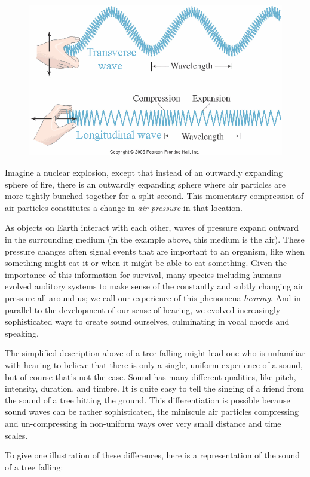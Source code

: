 \documentclass[UTF8]{book}
\begin{document}
\begin{CJK}{UTF8}{gbsn}
\begin{figure}[H]
\centering
\includegraphics[width=0.8\linewidth]{longvstransvwave}
\end{figure}

Imagine a nuclear explosion, except that instead of an outwardly expanding sphere of fire, there is an outwardly expanding sphere where air particles are more tightly bunched together for a split second. This momentary compression of air particles constitutes a change in \emph{air pressure} in that location.

As objects on Earth interact with each other, waves of pressure expand outward in the surrounding medium (in the example above, this medium is the air). These pressure changes often signal events that are important to an organism, like when something might eat it or when it might be able to eat something. Given the importance of this information for survival, many species including humans evolved auditory systems to make sense of the constantly and subtly changing air pressure all around us; we call our experience of this phenomena \emph{hearing}. And in parallel to the development of our sense of hearing, we evolved increasingly sophisticated ways to create sound ourselves, culminating in vocal chords and speaking.

The simplified description above of a tree falling might lead one who is unfamiliar with hearing to believe that there is only a single, uniform experience of a sound, but of course that's not the case. Sound has many different qualities, like pitch, intensity, duration, and timbre. It is quite easy to tell the singing of a friend from the sound of a tree hitting the ground. This differentiation is possible because sound waves can be rather sophisticated, the miniscule air particles compressing and un-compressing in non-uniform ways over very small distance and time scales.

To give one illustration of these differences, here is a representation of the sound of a tree falling:


\end{CJK}
\end{document}
